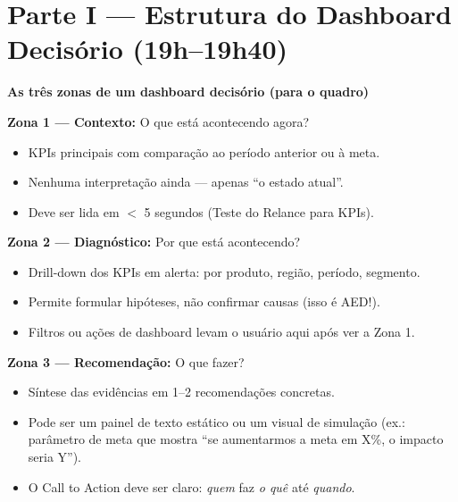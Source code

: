 \section{Parte I — Estrutura do Dashboard Decisório (19h–19h40)}

\begin{BoardBox}
\textbf{As três zonas de um dashboard decisório (para o quadro)}

\textbf{Zona 1 — Contexto:} O que está acontecendo agora?
\begin{itemize}
  \item KPIs principais com comparação ao período anterior ou à meta.
  \item Nenhuma interpretação ainda — apenas ``o estado atual''.
  \item Deve ser lida em $<$ 5 segundos (Teste do Relance para KPIs).
\end{itemize}

\textbf{Zona 2 — Diagnóstico:} Por que está acontecendo?
\begin{itemize}
  \item Drill-down dos KPIs em alerta: por produto, região, período, segmento.
  \item Permite formular hipóteses, não confirmar causas (isso é AED!).
  \item Filtros ou ações de dashboard levam o usuário aqui após ver a Zona 1.
\end{itemize}

\textbf{Zona 3 — Recomendação:} O que fazer?
\begin{itemize}
  \item Síntese das evidências em 1–2 recomendações concretas.
  \item Pode ser um painel de texto estático ou um visual de simulação
  (ex.: parâmetro de meta que mostra ``se aumentarmos a meta em X\%, o impacto seria Y'').
  \item O Call to Action deve ser claro: \emph{quem} faz \emph{o quê} até \emph{quando}.
\end{itemize}
\end{BoardBox}

